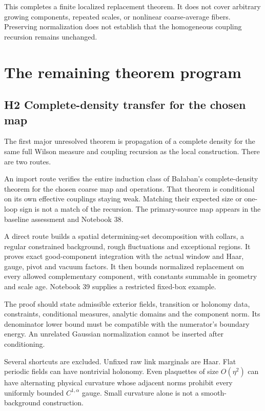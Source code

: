 \documentclass[11pt]{article}
\theoremstyle{remark}
\begin{document}
This completes a finite localized replacement theorem.
It does not cover arbitrary growing components,
repeated scales, or nonlinear coarse-average fibers.
Preserving normalization does not establish that the
homogeneous coupling recursion remains unchanged.

\section{The remaining theorem program}
\label{hdc-open}

\subsection{H2 Complete-density transfer for the chosen map}

The first major unresolved theorem is propagation of
a complete density for the same full Wilson measure
and coupling recursion as the local construction.
There are two routes.

An import route verifies the entire induction class
of Ba{\l}aban's complete-density theorem for the chosen
coarse map and operations. That theorem is conditional
on its own effective couplings staying weak.
Matching their expected size or one-loop sign is not
a match of the recursion. The primary-source map
appears in the baseline assessment and Notebook 38.

A direct route builds a spatial determining-set
decomposition with collars, a regular constrained
background, rough fluctuations and exceptional
regions. It proves exact good-component integration
with the actual window and Haar, gauge, pivot and
vacuum factors. It then bounds normalized replacement
on every allowed complementary component, with
constants summable in geometry and scale age.
Notebook 39 supplies a restricted fixed-box example.

The proof should state admissible exterior fields,
transition or holonomy data, constraints, conditional
measures, analytic domains and the component norm.
Its denominator lower bound must be compatible with
the numerator's boundary energy. An unrelated
Gaussian normalization cannot be inserted after
conditioning.

Several shortcuts are excluded. Unfixed raw link
marginals are Haar. Flat periodic fields can have
nontrivial holonomy. Even plaquettes of size
\(O(\eta^2)\) can have alternating physical curvature
whose adjacent norms prohibit every uniformly
bounded \(C^{1,\alpha}\) gauge. Small curvature
alone is not a smooth-background construction.
\end{document}
